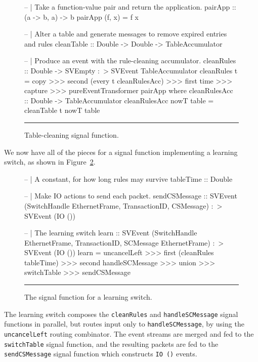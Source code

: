 \begin{figure}
\begin{code}
-- | Take a function-value pair and return the application.
pairApp :: (a -> b, a) -> b
pairApp (f, x) = f x

-- | Alter a table and generate messages to remove expired entries and rules
cleanTable :: Double -> Double -> TableAccumulator


-- | Produce an event with the rule-cleaning accumulator.
cleanRules :: Double -> SVEmpty :~> SVEvent TableAccumulator
cleanRules t = copy >>>
               second (every t cleanRulesAcc) >>>
               first time >>>
               capture >>>
               pureEventTransformer pairApp
  where 
    cleanRulesAcc :: Double -> TableAccumulator
    cleanRulesAcc nowT table = cleanTable t nowT table
\end{code}
\hrule
\caption{Table-cleaning signal function.}
\label{figure:clean_sf}
\end{figure}

We now have all of the pieces for a signal function implementing a learning
switch, as shown in Figure~\ref{figure:learn_sf}.

\begin{figure}
\begin{code}
-- | A constant, for how long rules may survive
tableTime :: Double

-- | Make IO actions to send each packet.
sendCSMessage ::     SVEvent (SwitchHandle EthernetFrame,
                              TransactionID,
                              CSMessage)
                 :~> SVEvent (IO ())

-- | The learning switch
learn ::     SVEvent (SwitchHandle EthernetFrame,
                      TransactionID,
                      SCMessage EthernetFrame)
         :~> SVEvent (IO ())
learn = uncancelLeft >>> 
        first (cleanRules tableTime) >>>
        second handleSCMessage >>>
        union >>>
        switchTable >>>
        sendCSMessage
\end{code}
\hrule
\caption{The signal function for a learning switch.}
\label{figure:learn_sf}
\end{figure}

The learning switch composes the {\tt cleanRules} and {\tt handleSCMessage}
signal functions in parallel, but routes input only to {\tt handleSCMessage},
by using the {\tt uncancelLeft} routing combinator. The event streams are
merged and fed to the {\tt switchTable} signal function, and the resulting
packets are fed to the {\tt sendCSMessage} signal function which constructs
{\tt IO ()} events.

